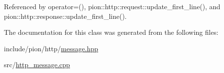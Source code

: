 Referenced by operator=(), pion\-::http\-::request\-::update\-\_\-first\-\_\-line(), and pion\-::http\-::response\-::update\-\_\-first\-\_\-line().



The documentation for this class was generated from the following files\-:\begin{DoxyCompactItemize}
\item 
include/pion/http/\hyperlink{message_8hpp}{message.\-hpp}\item 
src/\hyperlink{http__message_8cpp}{http\-\_\-message.\-cpp}\end{DoxyCompactItemize}

